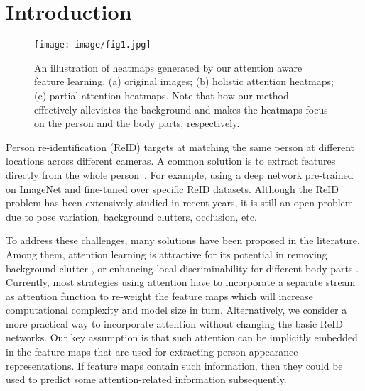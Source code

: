 \documentclass[10pt,twocolumn,letterpaper]{article}
\begin{document}
\section{Introduction}

\begin{figure}[t]		 \begin{center}
\texttt{[image: image/fig1.jpg]}
	\end{center}
	\vspace{-4mm}
	\caption{An illustration of heatmaps generated by our attention aware feature learning. (a) original images; (b) holistic attention heatmaps; (c) partial attention heatmaps. Note that how our method effectively alleviates the background and makes the heatmaps focus on the person and the body parts, respectively.}
	\label{fig:fig1}
	\vspace{-5mm}
\end{figure}

Person re-identification (ReID) targets at matching the same person at different locations across different cameras. A common solution is to extract features directly from the whole person~\cite{hermans2017defense,sun2017svdnet}. For example, using a deep network pre-trained on ImageNet and fine-tuned over specific ReID datasets. Although the ReID problem has been extensively studied in recent years, it is still an open problem due to pose variation, background clutters, occlusion, etc.

To address these challenges, many solutions have been proposed in the literature. Among them, attention learning is attractive for its potential in removing background clutter \cite{song2018mask}, or enhancing local discriminability for different body parts \cite{zhao2017deeply}. Currently, most strategies using attention have to incorporate a separate stream as attention function to re-weight the feature maps which will increase computational complexity and model size in turn. Alternatively, we consider a more practical way to incorporate attention without changing the basic ReID networks. Our key assumption is that such attention can be implicitly embedded in the feature maps that are used for extracting person appearance representations. If feature maps contain such information, then they could be used to predict some attention-related information subsequently. 
\end{document}
